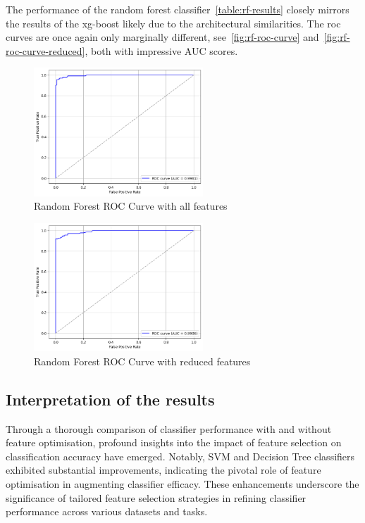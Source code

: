 \documentclass[conference]{IEEEtran}
\begin{document}
The performance of the random forest classifier~\autoref{table:rf-results} closely mirrors the results of the xg-boost likely due to the architectural similarities. The roc curves are once again only marginally different, see~\autoref{fig:rf-roc-curve} and~\autoref{fig:rf-roc-curve-reduced}, both with impressive AUC scores.

\begin{figure}[h]
	\begin{center}
		\includegraphics[width=2.5in]{rf-roc-curve}
		\caption{Random Forest ROC Curve with all features}\label{fig:rf-roc-curve}
	\end{center}
\end{figure}

\begin{figure}[h]
	\begin{center}
		\includegraphics[width=2.5in]{rf-roc-curve-reduced}
		\caption{Random Forest ROC Curve with reduced features}\label{fig:rf-roc-curve-reduced}
	\end{center}
\end{figure}

\subsection{Interpretation of the results}

Through a thorough comparison of classifier performance with and without feature optimisation, profound insights into the impact of feature selection on classification accuracy have emerged. Notably, SVM and Decision Tree classifiers exhibited substantial improvements, indicating the pivotal role of feature optimisation in augmenting classifier efficacy. These enhancements underscore the significance of tailored feature selection strategies in refining classifier performance across various datasets and tasks.
\end{document}
